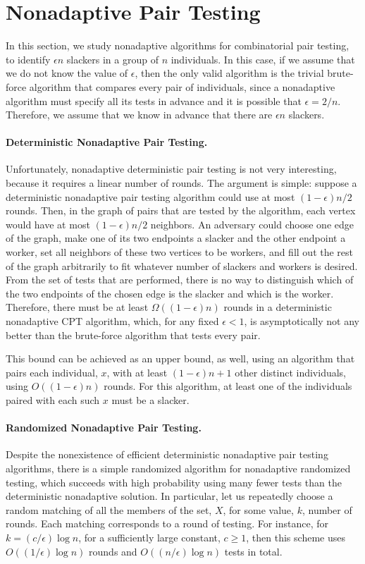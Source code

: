 \documentclass[11pt]{llncs}
\renewcommand{\subsection}[1]{\paragraph{\bf #1.}}
\begin{document}
 \section{Nonadaptive Pair Testing}
In this section, we study nonadaptive algorithms for combinatorial 
pair testing, to identify $\epsilon n$ slackers in a group of $n$
individuals. In this case, if we assume that we 
do not know the value of $\epsilon$, then the only valid algorithm is the
trivial brute-force algorithm that compares every pair of individuals, since
a nonadaptive algorithm must specify all its tests in advance and it is
possible that $\epsilon=2/n$.
Therefore, we assume that we know in advance that there are $\epsilon n$ slackers.

\subsection{Deterministic Nonadaptive Pair Testing}
Unfortunately,
nonadaptive deterministic pair testing is not very interesting,
because it requires a linear number of rounds.
The argument is simple: suppose a deterministic nonadaptive pair testing algorithm could use at most $(1-\epsilon) n/2$
rounds. Then, in the graph of pairs that are tested by the algorithm,
each vertex would have at most $(1-\epsilon) n/2$ neighbors. An adversary could choose
one edge of the graph, make one of its two endpoints a slacker and the
other endpoint a worker, set all neighbors of these two vertices to be
workers, and fill out the rest of the graph arbitrarily to fit whatever
number of slackers and workers is desired.
From the set of tests that are performed, there is no way to distinguish
which of the two endpoints of the chosen edge is the slacker and which
is the worker.
Therefore, there must be at least $\Omega((1-\epsilon)n)$ rounds in a
deterministic nonadaptive CPT algorithm, which, for any fixed $\epsilon<1$,
is asymptotically not any better than the brute-force algorithm that tests
every pair.

This bound can be achieved as an upper bound, as well, using an algorithm
that pairs each individual, $x$, with at least $(1-\epsilon)n+1$ other distinct 
individuals, using $O((1-\epsilon)n)$ rounds. For this algorithm, at least one of the individuals
paired with each such $x$ must be a slacker.

\subsection{Randomized Nonadaptive Pair Testing}
Despite the nonexistence of efficient deterministic nonadaptive pair testing algorithms, there is a simple randomized algorithm 
for nonadaptive randomized testing, which
succeeds with high probability using many fewer tests than the deterministic
nonadaptive solution.
In particular, let us repeatedly choose a random matching of all the
members of the set, $X$, for some value, $k$, 
number of rounds.
Each matching corresponds to a round of testing. 
For instance, for $k=(c/\epsilon)\log n$, for 
a sufficiently large constant, $c\ge 1$,
then this scheme uses $O((1/\epsilon)\log n)$ rounds and
$O((n/\epsilon)\log n)$ tests in total.
\end{document}

